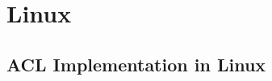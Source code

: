 \documentclass[draft]{article}
\begin{document}
% 
% 
% 
% 
% 
% 

\section*{Linux}

\subsection*{ACL Implementation in Linux}
% 
% 
\end{document}
